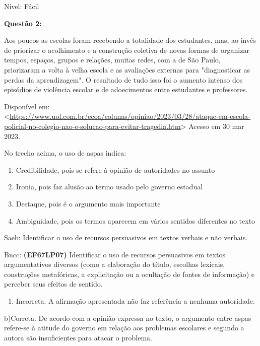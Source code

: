 {Nível: Fácil

\textbf{Questão 2:}

Aos poucos as escolas foram recebendo a totalidade dos estudantes, mas,
ao invés de priorizar o acolhimento e a construção coletiva de novas
formas de organizar tempos, espaços, grupos e relações, muitas redes,
com a de São Paulo, priorizaram a volta à velha escola e as avaliações
externas para "diagnosticar as perdas da aprendizagem". O resultado de
tudo isso foi o aumento intenso dos episódios de violência escolar e de
adoecimentos entre estudantes e professores.

Disponível em:
\textless{}\href{https://www.uol.com.br/ecoa/colunas/opiniao/2023/03/28/ataque-em-escola-policial-no-colegio-nao-e-solucao-para-evitar-tragedia.htm}{\uline{https://www.uol.com.br/ecoa/colunas/opiniao/2023/03/28/ataque-em-escola-policial-no-colegio-nao-e-solucao-para-evitar-tragedia.htm}}\textgreater{}
Acesso em 30 mar 2023.

No trecho acima, o uso de aspas indica:

\begin{enumerate}
\def\labelenumi{\alph{enumi})}
\item
  Credibilidade, pois se refere à opinião de autoridades no assunto
\item
  Ironia, pois faz alusão ao termo usado pelo governo estadual
\item
  Destaque, pois é o argumento mais importante
\item
  Ambiguidade, pois os termos aparecem em vários sentidos diferentes no
  texto
\end{enumerate}

Saeb: Identificar o uso de recursos persuasivos em textos verbais e não
verbais.

Bncc: \textbf{(EF67LP07)} Identificar o uso de recursos persuasivos em
textos argumentativos diversos (como a elaboração do título, escolhas
lexicais, construções metafóricas, a explicitação ou a ocultação de
fontes de informação) e perceber seus efeitos de sentido.

\begin{enumerate}
\def\labelenumi{\arabic{enumi}.}
\tightlist
\item
  Incorreta. A afirmação apresentada não faz referência a nenhuma
  autoridade.
\end{enumerate}

b)Correta. De acordo com a opinião expressa no texto, o argumento entre
aspas refere-se à atitude do governo em relação aos problemas escolares
e segundo a autora são insuficientes para atacar o problema.

}
